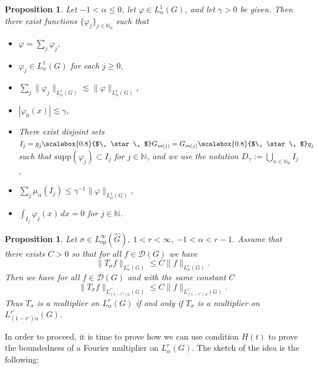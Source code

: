 \documentclass[12pt, reqno]{amsart}
\newtheorem{pro}[defi]{Proposition}
\newcommand{\1}{\mathds{1}}
\newcommand{\smallstar}{\scalebox{0.8}{$\, \star \, $}}
\begin{document}
\begin{pro}\label{proCalderonZygmund}
    Let $-1<\alpha\leq 0$, let $\varphi\in L^{1}_{\alpha}(G)$, and let $\gamma>0$ be given. Then there exist functions $\{\varphi_{j}\}_{j\in\mathbb{N}_{0}}$ such that
\begin{itemize}
    \item[(i)] $\varphi=\sum_{j}\varphi_{j}$,
    \item[(ii)] $\varphi_{j}\in L^{1}_{\alpha}(G)$ for each $j\geq 0$,
    \item[(iii)] $\sum_{j}\|\varphi_{j}\|_{L^{1}_{\alpha}(G)}\lesssim \|\varphi\|_{L^{1}_{\alpha}(G)}$,
    \item[(iv)] $|\varphi_{0}(x)|\lesssim \gamma$,
    \item[(v)] There exist disjoint sets $I_{j}=g_{j} \smallstar G_{m(j)}=G_{m(j)}\smallstar g_{j}$ such that $\mathrm{supp}(\varphi_{j})\subset I_{j}$ for $j\in\mathbb{N}$, and we use the notation $D_{\gamma}:=\bigcup_{n\in\mathbb{N}_{0}}I_{j}$,
    \item[(vi)] $\sum_{j}\mu_{\alpha}(I_{j})\leq \gamma^{-1}\|\varphi\|_{L^{1}_{\alpha}(G)}$,
    \item[(vii)] $\displaystyle\int_{I_{j}}\varphi_{j}(x)\,dx=0$ for $j\in\mathbb{N}$.
\end{itemize}

\end{pro}


\begin{pro}\label{prointerpolationDual}
    Let $\sigma\in L^{\infty}_{\mathrm{op}}(\widehat{G})$, $1<r<\infty$, $-1<\alpha<r-1$. Assume that there exists $C>0$ so that for all $f\in\mathcal{D}(G)$ we have
\[
\|T_{\sigma}f\|_{L^{r}_{\alpha}(G)}\leq C\|f\|_{L^{r}_{\alpha}(G)}.
\]
Then we have for all $f\in\mathcal{D}(G)$ and with the same constant $C$
\[
\|T_{\sigma}f\|_{L^{r'}_{(1-r')\alpha}(G)}\leq C\|f\|_{L^{r'}_{(1-r')\alpha}(G)}.
\]
Thus $T_{\sigma}$ is a multiplier on $L^{r}_{\alpha}(G)$ if and only if $T_{\sigma}$ is a multiplier on
$L^{r'}_{(1-r')\alpha}(G)$.
\end{pro}


In order to proceed, it is time to prove how we can use condition $H(t)$ to prove the boundedness
of a Fourier multiplier on $L^{r}_{\alpha}(G)$. The sketch of the idea is the following:
\end{document}
